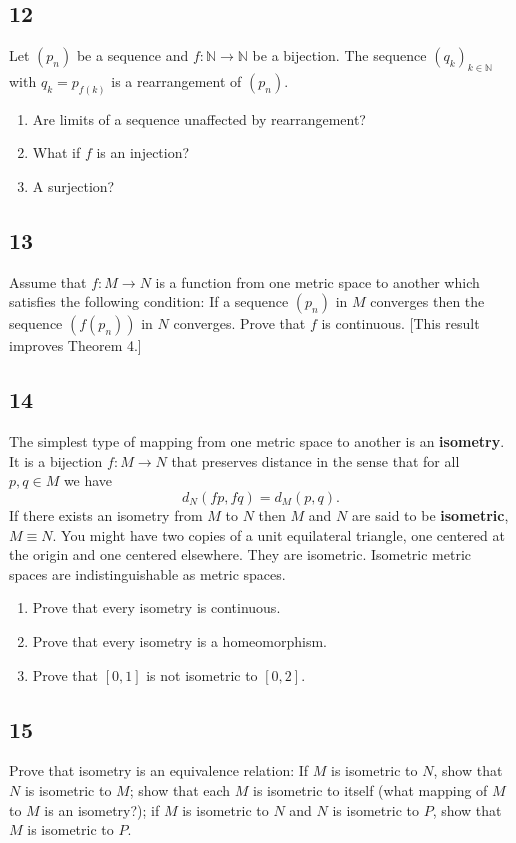 \documentclass{amsart}
\begin{document}
\subsection*{12}
Let $(p_n)$ be a sequence and $f : \mathbb{N} \to \mathbb{N}$ be a bijection. The sequence $(q_k)_{k \in \mathbb{N}}$ with $q_k = p_{f(k)}$ is a rearrangement of $(p_n)$.
\begin{enumerate}[label=(\alph*)]
\item Are limits of a sequence unaffected by rearrangement?
\item What if $f$ is an injection?
\item A surjection?
\end{enumerate}

\subsection*{13}
Assume that $f : M \to N$ is a function from one metric space to another which satisfies the following condition: If a sequence $(p_n)$ in $M$ converges then the sequence $(f(p_n))$ in $N$ converges. Prove that $f$ is continuous. [This result improves Theorem 4.]

\subsection*{14}
The simplest type of mapping from one metric space to another is an \textbf{isometry}. It is a bijection $f : M \to N$ that preserves distance in the sense that for all $p,q \in M$ we have
\[
d_N(fp, fq) = d_M(p,q).
\]
If there exists an isometry from $M$ to $N$ then $M$ and $N$ are said to be \textbf{isometric}, $M \equiv N$. You might have two copies of a unit equilateral triangle, one centered at the origin and one centered elsewhere. They are isometric. Isometric metric spaces are indistinguishable as metric spaces.
\begin{enumerate}[label=(\alph*)]
\item Prove that every isometry is continuous.
\item Prove that every isometry is a homeomorphism.
\item Prove that $[0,1]$ is not isometric to $[0,2]$.
\end{enumerate}

\subsection*{15}
Prove that isometry is an equivalence relation: If $M$ is isometric to $N$, show that $N$ is isometric to $M$; show that each $M$ is isometric to itself (what mapping of $M$ to $M$ is an isometry?); if $M$ is isometric to $N$ and $N$ is isometric to $P$, show that $M$ is isometric to $P$.
\end{document}
